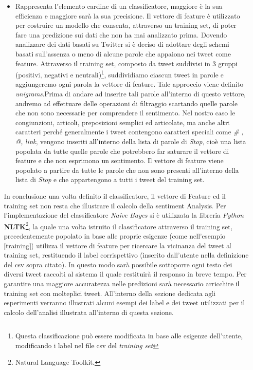 \begin{itemize}
\item Rappresenta l'elemento cardine di un classificatore, maggiore è la sua efficienza e maggiore sarà la sua precisione. Il vettore di feature è utilizzato per costruire un modello che consenta, attraverso un training set, di poter fare una predizione sui dati che non ha mai analizzato prima.
Dovendo analizzare dei dati basati su Twitter si è deciso di adottare degli schemi basati sull'assenza o meno di alcune parole che appaiono nei tweet come feature. Attraverso il training set, composto da tweet suddivisi in 3 gruppi (positivi, negativi e neutrali)\footnote{Questa classificazione può essere modificata in base alle esigenze dell'utente, modificando i label nel file csv del \textit{training set}}, suddividiamo ciascun tweet in parole e aggiungeremo ogni parola la vettore di feature. Tale approccio viene definito \textit{unigrams}.Prima di andare ad inserire tali parole all'interno di questo vettore, andremo ad effettuare delle operazioni di filtraggio scartando quelle parole che non sono necessarie per comprendere il sentimento. 
Nel nostro caso le congiunzioni, articoli, preposizioni semplici ed articolate, ma anche altri caratteri perché generalmente i tweet contengono caratteri speciali come \textit{\# , @, link},  vengono inseriti all'interno della lista di parole di \textit{Stop}, cioè una lista popolata da tutte quelle parole che potrebbero far saturare il vettore di feature e che non esprimono un sentimento.
Il vettore di feature viene popolato a partire da tutte le parole che non sono presenti all'interno della lista di \textit{Stop} e che appartengono a tutti i tweet del training set.
\end{itemize}
 
In conclusione una volta definito il classificatore, il vettore di Feature ed il training set non resta che illustrare il calcolo della sentiment Analysis.
Per l'implementazione del classificatore \textit{Naive Bayes} si è utilizzata la libreria \textit{Python} \textbf{NLTK}\footnote{Natural Language Toolkit.}, la quale una volta istruito il classificatore attraverso il training set, precedentemente popolato in base alle proprie esigenze (come nell'esempio \ref{training}) utilizza il vettore di feature per ricercare la vicinanza del tweet al training set, restituendo il label corrispettivo (inserito dall'utente nella definizione del csv sopra citato). In questo modo sarà possibile sottoporre ogni testo dei diversi tweet raccolti al sistema il quale restituirà il responso in breve tempo. Per garantire una maggiore accuratezza nelle predizioni sarà necessario arricchire il training set con molteplici tweet. All'interno della sezione dedicata agli esperimenti verranno illustrati alcuni esempi dei label e dei tweet utilizzati per il calcolo dell'analisi illustrata all'interno di questa sezione. 

